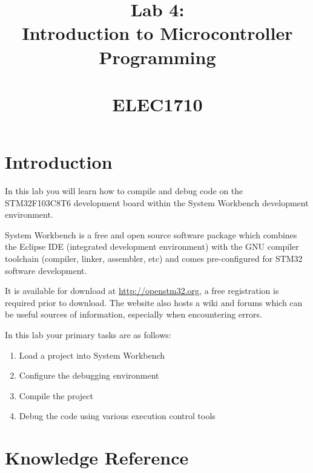 \documentclass{UoNMCHA}
\numberwithin{equation}{section}
\begin{document}
\title{Lab 4:\\Introduction to Microcontroller Programming \\ \ \\
{\small ELEC1710    \\ 
}}
\maketitle
\onecolumn

\vspace{-5mm}

\section{Introduction}

In this lab you will learn how to compile and debug code on the STM32F103C8T6 development board within the System Workbench development environment.

System Workbench is a free and open source software package which combines the Eclipse IDE (integrated development environment) with the GNU compiler toolchain (compiler, linker, assembler, etc) and comes pre-configured for STM32 software development.

It is available for download at \url{http://openstm32.org}, a free registration is required prior to download. The website also hosts a wiki and forums which can be useful sources of information, especially when encountering errors.

In this lab your primary tasks are as follows:

\begin{enumerate}
    \item Load a project into System Workbench
    \item Configure the debugging environment
    \item Compile the project
    \item Debug the code using various execution control tools
\end{enumerate}

\section{Knowledge Reference}
\end{document}
